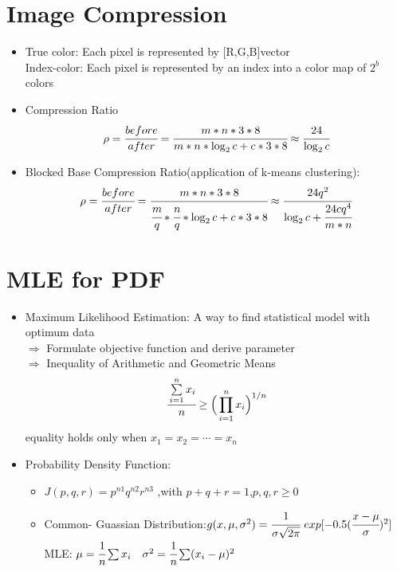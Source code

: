 \documentclass[12pt,a4paper,draft]{article}
\begin{document}
\section{Image Compression}%
\begin{itemize}
\item True color: Each pixel is represented by [R,G,B]vector\\ Index-color: Each pixel is represented by an index into a color map of $2^b$ colors
\item Compression Ratio
$$ \rho = \cfrac{before}{after} = \cfrac{m*n*3*8}{m*n*\log_2c+c*3*8}\approx\cfrac{24}{\log_2c}$$
\item Blocked Base Compression Ratio(application of k-means clustering):
 $$ \rho = \cfrac{before}{after} = \cfrac{m*n*3*8}{\cfrac{m}{q}*\cfrac{n}{q}*\log_2c+c*3*8}\approx\cfrac{24q^2}{\log_2c+\cfrac{24cq^4}{m*n}}$$
\end{itemize}
\section{MLE for PDF}%
\begin{itemize}
\item Maximum Likelihood Estimation: A way to find statistical model with optimum data\\
$\Rightarrow$ Formulate objective function and derive parameter\\ 
$\Rightarrow$ Inequality of Arithmetic and Geometric Means
$$\cfrac{\sum\limits_{i=1}^{n}x_i}{n} \geq \Big(\prod_{i=1}^{n} x_i \Big)^{1/n}$$ equality holds only when $x_1 = x_2 = \cdots = x_n$
\item Probability Density Function:
\begin{itemize}
\item $J(p,q,r) = p^{n1}q^{n2}r^{n3}$ ,with $p+q+r =1$,$p,q,r\geq 0$
\item Common- Guassian Distribution:$g(x,\mu,\sigma^2) = \cfrac{1}{\sigma\sqrt{2\pi}}\ exp[-0.5(\cfrac{x-\mu}{\sigma})^2]$ \\MLE: $\mu = \cfrac{1}{n}\sum x_i \quad \sigma^2 = \cfrac{1}{n}\sum (x_i - \mu)^2$
\end{itemize}
\end{itemize}
\end{document}
